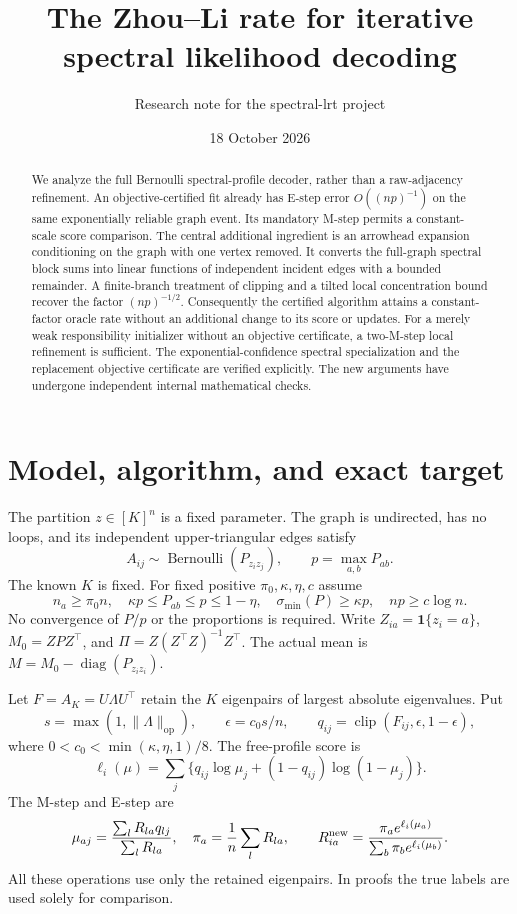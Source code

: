 \documentclass[11pt]{article}
\title{The Zhou--Li rate for iterative spectral likelihood decoding}
\author{Research note for the spectral-lrt project}
\date{18 October 2026}
\newcommand{\one}{\mathbf 1}
\newcommand{\op}{\mathrm{op}}
\newcommand{\clip}{\operatorname{clip}}
\begin{document}
\maketitle
\begin{abstract}
We analyze the full Bernoulli spectral-profile decoder, rather than a raw-adjacency refinement. An objective-certified fit already has E-step error $O((np)^{-1})$ on the same exponentially reliable graph event. Its mandatory M-step permits a constant-scale score comparison. The central additional ingredient is an arrowhead expansion conditioning on the graph with one vertex removed. It converts the full-graph spectral block sums into linear functions of independent incident edges with a bounded remainder. A finite-branch treatment of clipping and a tilted local concentration bound recover the factor $(np)^{-1/2}$. Consequently the certified algorithm attains a constant-factor oracle rate without an additional change to its score or updates. For a merely weak responsibility initializer without an objective certificate, a two-M-step local refinement is sufficient. The exponential-confidence spectral specialization and the replacement objective certificate are verified explicitly. The new arguments have undergone independent internal mathematical checks.
\end{abstract}

\section{Model, algorithm, and exact target}
The partition $z\in[K]^n$ is a fixed parameter. The graph is undirected, has no loops, and its independent upper-triangular edges satisfy
\[
 A_{ij}\sim\operatorname{Bernoulli}(P_{z_i z_j}),\qquad
 p=\max_{a,b}P_{ab}.
\]
The known $K$ is fixed. For fixed positive $\pi_0,\kappa,\eta,c$ assume
\begin{equation}\label{eq:model}
 n_a\ge\pi_0 n,\quad \kappa p\le P_{ab}\le p\le1-\eta,
 \quad\sigma_{\min}(P)\ge\kappa p,\quad np\ge c\log n.
\end{equation}
No convergence of $P/p$ or the proportions is required. Write $Z_{ia}=\one\{z_i=a\}$, $M_0=ZPZ^\top$, and $\Pi=Z(Z^\top Z)^{-1}Z^\top$. The actual mean is $M=M_0-\operatorname{diag}(P_{z_i z_i})$.

Let $F=A_K=U\Lambda U^\top$ retain the $K$ eigenpairs of largest absolute eigenvalues. Put
\[
 s=\max(1,\|\Lambda\|_\op),\qquad \epsilon=c_0s/n,
 \qquad q_{ij}=\clip(F_{ij},\epsilon,1-\epsilon),
\]
where $0<c_0<\min(\kappa,\eta,1)/8$. The free-profile score is
\[
 \ell_i(\mu)=\sum_j\{q_{ij}\log\mu_j+(1-q_{ij})\log(1-\mu_j)\}.
\]
The M-step and E-step are
\[
 \mu_{aj}=\frac{\sum_lR_{la}q_{lj}}{\sum_lR_{la}},\quad
 \pi_a=\frac1n\sum_lR_{la},\qquad
 R^{\rm new}_{ia}=\frac{\pi_a e^{\ell_i(\mu_a)}}{\sum_b\pi_b e^{\ell_i(\mu_b)}}.
\]
All these operations use only the retained eigenpairs. In proofs the true labels are used solely for comparison.
\end{document}
